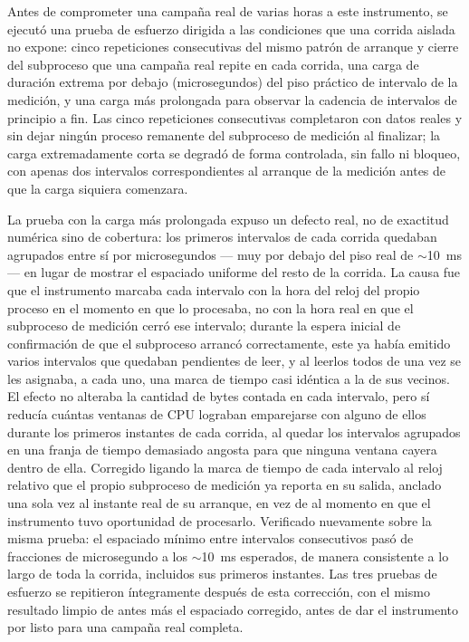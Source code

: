 \documentclass[12pt,oneside,spanish]{book}
\begin{document}
Antes de comprometer una campaña real de varias horas a este instrumento, se ejecutó una prueba de esfuerzo dirigida a las condiciones que una corrida aislada no expone: cinco repeticiones consecutivas del mismo patrón de arranque y cierre del subproceso que una campaña real repite en cada corrida, una carga de duración extrema por debajo (microsegundos) del piso práctico de intervalo de la medición, y una carga más prolongada para observar la cadencia de intervalos de principio a fin. Las cinco repeticiones consecutivas completaron con datos reales y sin dejar ningún proceso remanente del subproceso de medición al finalizar; la carga extremadamente corta se degradó de forma controlada, sin fallo ni bloqueo, con apenas dos intervalos correspondientes al arranque de la medición antes de que la carga siquiera comenzara.

La prueba con la carga más prolongada expuso un defecto real, no de exactitud numérica sino de cobertura: los primeros intervalos de cada corrida quedaban agrupados entre sí por microsegundos --- muy por debajo del piso real de $\sim$10~ms --- en lugar de mostrar el espaciado uniforme del resto de la corrida. La causa fue que el instrumento marcaba cada intervalo con la hora del reloj del propio proceso en el momento en que lo procesaba, no con la hora real en que el subproceso de medición cerró ese intervalo; durante la espera inicial de confirmación de que el subproceso arrancó correctamente, este ya había emitido varios intervalos que quedaban pendientes de leer, y al leerlos todos de una vez se les asignaba, a cada uno, una marca de tiempo casi idéntica a la de sus vecinos. El efecto no alteraba la cantidad de bytes contada en cada intervalo, pero sí reducía cuántas ventanas de CPU lograban emparejarse con alguno de ellos durante los primeros instantes de cada corrida, al quedar los intervalos agrupados en una franja de tiempo demasiado angosta para que ninguna ventana cayera dentro de ella. Corregido ligando la marca de tiempo de cada intervalo al reloj relativo que el propio subproceso de medición ya reporta en su salida, anclado una sola vez al instante real de su arranque, en vez de al momento en que el instrumento tuvo oportunidad de procesarlo. Verificado nuevamente sobre la misma prueba: el espaciado mínimo entre intervalos consecutivos pasó de fracciones de microsegundo a los $\sim$10~ms esperados, de manera consistente a lo largo de toda la corrida, incluidos sus primeros instantes. Las tres pruebas de esfuerzo se repitieron íntegramente después de esta corrección, con el mismo resultado limpio de antes más el espaciado corregido, antes de dar el instrumento por listo para una campaña real completa.
\end{document}

